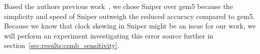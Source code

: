 Based the authors previous work~\cite{Olsen2014}, we chose Sniper over gem5 because the simplicity and speed of Sniper outweigh the reduced accuracy compared to gem5.
Because we know that clock skewing in Sniper might be an issue for our work, we will perform an experiment investigating this error source further in section~\ref{sec:results:csmb_sensitivity}.
